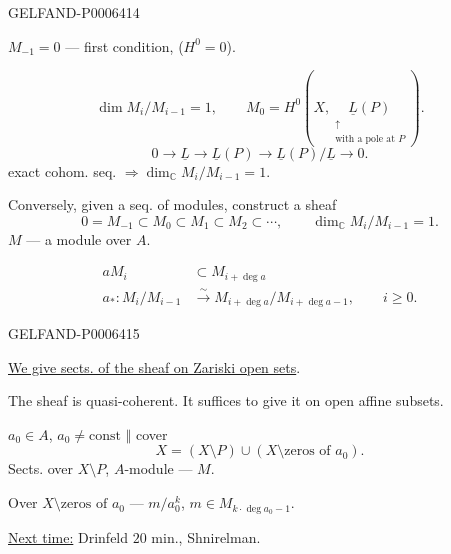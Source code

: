\begin{GelfandAdjacentEvidence}{GELFAND-P000641}{4}


\(M_{-1}=0\) --- first condition, (\(H^0=0\)).

\[
\dim M_i/M_{i-1}=1,\qquad
M_0=H^0(X,\underset{\substack{\uparrow\\\text{with a pole at }P}}{\underline L(P)}).
\]
\[
0\to\underline L\to\underline L(P)\to\underline L(P)/\underline L\to0.
\]
exact cohom. seq. \(\Rightarrow\dim_{\mathbb C}M_i/M_{i-1}=1\).

\begin{center}\shortstack{\textemdash\\[-.35em]\textemdash}\end{center}

Conversely, given a seq. of modules, construct a sheaf
\[
0=M_{-1}\subset M_0\subset M_1\subset M_2\subset\cdots,\qquad
\dim_{\mathbb C}M_i/M_{i-1}=1.
\]
\(M\) --- a module over \(A\).

\[
\begin{aligned}
aM_i&\subset M_{i+\operatorname{deg}a}\\
a_*:M_i/M_{i-1}&\overset{\sim}{\to}
M_{i+\operatorname{deg}a}/M_{i+\operatorname{deg}a-1},\qquad i\geqslant0.
\end{aligned}
\]
\end{GelfandAdjacentEvidence}
\begin{GelfandAdjacentEvidence}{GELFAND-P000641}{5}


\underline{We give sects. of the sheaf on Zariski open sets}.

The sheaf is quasi-coherent. It suffices to give it on open affine subsets.

\(a_0\in A\), \(a_0\ne\mathrm{const}\) \(\Vert\) cover
\[
X=(X\setminus P)\cup(X\setminus\text{zeros of }a_0).
\]
Sects. over \(X\setminus P\), \(A\)-module --- \(M\).

Over \(X\setminus\text{zeros of }a_0\) --- \(m/a_0^k\),
\(m\in M_{k\cdot\operatorname{deg}a_0-1}\).

\underline{Next time:} Drinfeld \(20\) min., Shnirelman.
\end{GelfandAdjacentEvidence}



